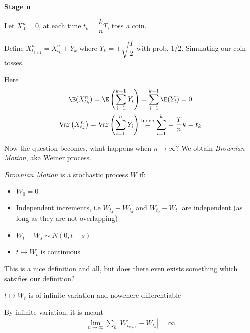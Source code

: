 \noindent\textbf{Stage n}\par
\noindent Let $X_0^n = 0$, at each time $t_k = \dfrac{k}{n}T$, toss a coin.\par
\noindent Define $X_{t_{k+1}}^n = X_{t_k}^n+Y_k$ where $Y_k = \pm\sqrt{\dfrac{T}{2}}$ with prob. 1/2. Simulating our coin tosses.\par
\noindent Here
\begin{equation*}
  \begin{gathered}
    \E(X_{t_k}^n) = \E\left(\sum_{i=1}^{k-1}Y_i\right) = \sum_{i=1}^{k-1}\E(Y_i) = 0\\
    \text{Var}\left(X_{t_k}^n\right) = \text{Var}\left(\sum_{i=1}^{n}Y_i\right)\stackrel{\text{indep}}{=}\sum_{i=1}^{k} = \dfrac{T}{n}k = t_k
  \end{gathered}
\end{equation*}
\par\bigskip
\noindent Now the question becomes, what happens when $n\to\infty$? We obtain \textit{Brownian Motion}, aka Weiner process.
\par\bigskip
\begin{defo}{}
  \textit{Brownian Motion} is a stochastic process $W$ if:\par
  \begin{itemize}
    \item $W_0=0$
    \item Independent increments, i.e $W_{t_4}-W_{t_3}$ and $W_{t_2}-W_{t_1}$ are independent (as long as they are not overlapping)
    \item $W_t-W_s\sim N(0,t-s)$
    \item $t\mapsto W_t$ is continuous
  \end{itemize}
\end{defo}
\par\bigskip
\noindent This is a nice definition and all, but does there even exists something which satsifies our definition?
\par\bigskip
\begin{theo}[]{}
  $t\mapsto W_t$ is of infinite variation and nowehere differentiable\par
  \noindent By infinite variation, it is meant
  \begin{equation*}
    \begin{gathered}
      \lim_{n\to\infty}\sum_k\left|W_{t_{k+1}}-W_{t_k}\right| =\infty
    \end{gathered}
  \end{equation*}
\end{theo}
